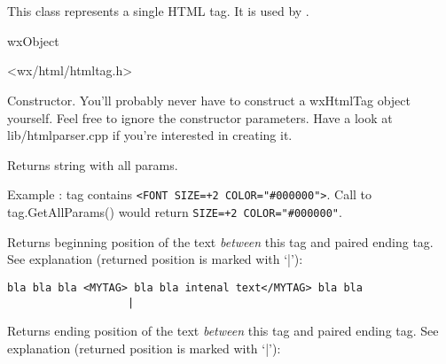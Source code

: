 %
%

\section{}\label{wxhtmltag}

This class represents a single HTML tag. 
It is used by .


wxObject


<wx/html/htmltag.h>


\label{wxhtmltagwxhtmltag}


Constructor. You'll probably never have to construct a wxHtmlTag object
yourself. Feel free to ignore the constructor parameters.
Have a look at lib/htmlparser.cpp if you're interested in creating it.

\label{wxhtmltaggetallparams}


Returns string with all params. 

Example : tag contains {\tt <FONT SIZE=+2 COLOR="\#000000">}. Call to
tag.GetAllParams() would return {\tt SIZE=+2 COLOR="\#000000"}.


\label{wxhtmltaggetbeginpos}


Returns beginning position of the text {\it between} this tag and paired
ending tag. 
See explanation (returned position is marked with `|'):

\begin{verbatim}
bla bla bla <MYTAG> bla bla intenal text</MYTAG> bla bla
                   |
\end{verbatim}


\label{wxhtmltaggetendpos1}


Returns ending position of the text {\it between} this tag and paired
ending tag.
See explanation (returned position is marked with `|'):

